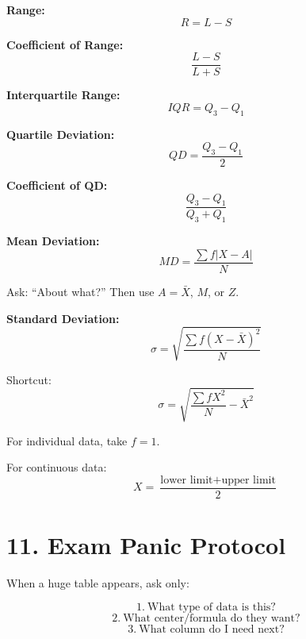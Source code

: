 \documentclass[10pt,a4paper]{article}
\begin{document}
\textbf{Range:}
\[
\boxed{R=L-S}
\]

\textbf{Coefficient of Range:}
\[
\boxed{\frac{L-S}{L+S}}
\]

\textbf{Interquartile Range:}
\[
\boxed{IQR=Q_3-Q_1}
\]

\textbf{Quartile Deviation:}
\[
\boxed{QD=\frac{Q_3-Q_1}{2}}
\]

\textbf{Coefficient of QD:}
\[
\boxed{\frac{Q_3-Q_1}{Q_3+Q_1}}
\]

\textbf{Mean Deviation:}
\[
\boxed{MD=\frac{\sum f|X-A|}{N}}
\]

Ask: ``About what?'' Then use $A=\bar X$, $M$, or $Z$.

\textbf{Standard Deviation:}
\[
\boxed{\sigma=\sqrt{\frac{\sum f(X-\bar X)^2}{N}}}
\]

Shortcut:
\[
\boxed{\sigma=\sqrt{\frac{\sum fX^2}{N}-\bar X^2}}
\]

For individual data, take $f=1$.

For continuous data:
\[
\boxed{X=\frac{\text{lower limit}+\text{upper limit}}{2}}
\]

\section*{11. Exam Panic Protocol}

When a huge table appears, ask only:

\[
\boxed{1.\ \text{What type of data is this?}}
\]
\[
\boxed{2.\ \text{What center/formula do they want?}}
\]
\[
\boxed{3.\ \text{What column do I need next?}}
\]
\end{document}
